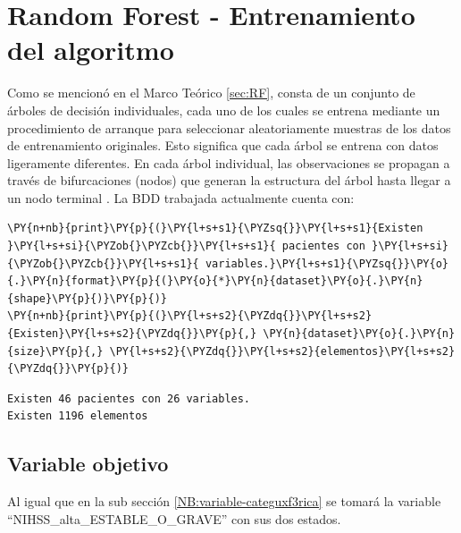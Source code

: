     \hypertarget{random-forest---entrenamiento-del-algoritmo}{%
\section{Random Forest - Entrenamiento del algoritmo}\label{random-forest---entrenamiento-del-algoritmo}}

	Como se mencionó en el Marco Teórico \ref{sec:RF}, consta de un conjunto de árboles de decisión individuales, cada uno de los cuales se entrena mediante un procedimiento de arranque para seleccionar aleatoriamente muestras de los datos de entrenamiento originales. Esto significa que cada árbol se entrena con datos ligeramente diferentes. En cada árbol individual, las observaciones se propagan a través de bifurcaciones (nodos) que generan la estructura del árbol hasta llegar a un nodo terminal \cite{cien2001}.
	La BDD trabajada actualmente cuenta con:

    \begin{tcolorbox}[breakable, size=fbox, boxrule=1pt, pad at break*=1mm,colback=cellbackground, colframe=cellborder]
\begin{Verbatim}[commandchars=\\\{\}]
\PY{n+nb}{print}\PY{p}{(}\PY{l+s+s1}{\PYZsq{}}\PY{l+s+s1}{Existen }\PY{l+s+si}{\PYZob{}\PYZcb{}}\PY{l+s+s1}{ pacientes con }\PY{l+s+si}{\PYZob{}\PYZcb{}}\PY{l+s+s1}{ variables.}\PY{l+s+s1}{\PYZsq{}}\PY{o}{.}\PY{n}{format}\PY{p}{(}\PY{o}{*}\PY{n}{dataset}\PY{o}{.}\PY{n}{shape}\PY{p}{)}\PY{p}{)}
\PY{n+nb}{print}\PY{p}{(}\PY{l+s+s2}{\PYZdq{}}\PY{l+s+s2}{Existen}\PY{l+s+s2}{\PYZdq{}}\PY{p}{,} \PY{n}{dataset}\PY{o}{.}\PY{n}{size}\PY{p}{,} \PY{l+s+s2}{\PYZdq{}}\PY{l+s+s2}{elementos}\PY{l+s+s2}{\PYZdq{}}\PY{p}{)}
\end{Verbatim}
\end{tcolorbox}

    \begin{Verbatim}[commandchars=\\\{\}]
Existen 46 pacientes con 26 variables.
Existen 1196 elementos
    \end{Verbatim}

    \hypertarget{variable-categuxf3rica}{%
\subsection{Variable objetivo}\label{variable-categuxf3rica}}

 Al igual que en la sub sección \ref{NB:variable-categuxf3rica} se tomará la variable ``NIHSS\_alta\_ESTABLE\_O\_GRAVE'' con sus dos estados.
 

